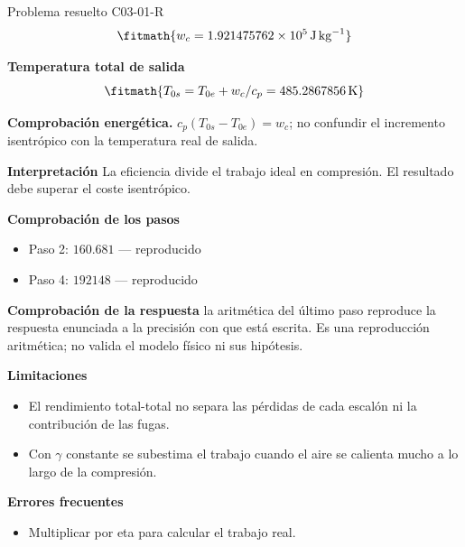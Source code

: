 \documentclass[10pt,openany]{book}
\begin{document}
\begin{studiumworked}{Problema resuelto C03-01-R}
\[
\fitmath{w_c=1.921475762\times10^{5}\,\mathrm{J}\,\mathrm{kg}^{-1}}
\]

\noindent\textbf{Temperatura total de salida}
\[
\fitmath{T_{0s}=T_{0e}+w_c/c_p=485.2867856\,\mathrm{K}}
\]

\noindent\textbf{Comprobación energética.} $c_p(T_{0s}-T_{0e})=w_c$; no confundir el incremento isentrópico con la temperatura real de salida.

\noindent\textbf{Interpretación}
La eficiencia divide el trabajo ideal en compresión. El resultado debe superar el coste isentrópico.

\noindent\textbf{Comprobación de los pasos}
\begin{itemize}
\item Paso 2: $160.681$ — reproducido
\item Paso 4: $192148$ — reproducido
\end{itemize}

\noindent\textbf{Comprobación de la respuesta} la aritmética del último paso reproduce la respuesta enunciada a la precisión con que está escrita. Es una reproducción aritmética; no valida el modelo físico ni sus hipótesis.

\noindent\textbf{Limitaciones}
\begin{itemize}
\item El rendimiento total-total no separa las pérdidas de cada escalón ni la contribución de las fugas.
\item Con $\gamma$ constante se subestima el trabajo cuando el aire se calienta mucho a lo largo de la compresión.
\end{itemize}

\noindent\textbf{Errores frecuentes}
\begin{itemize}
\item Multiplicar por eta para calcular el trabajo real.
\end{itemize}
\end{studiumworked}
\end{document}
